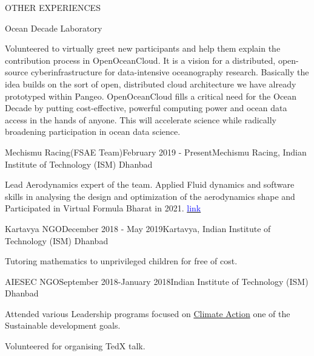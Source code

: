 \documentclass{resume} %
\begin{document}
\begin{rSection}{OTHER EXPERIENCES}
\begin{rSubsection}{Ocean Decade Laboratory}{}{}
\item Volunteered to virtually greet new participants and help them explain the contribution process in OpenOceanCloud. It is a vision for a distributed, open-source cyberinfrastructure for data-intensive oceanography research. Basically the idea builds on the sort of open, distributed cloud architecture we have already prototyped within Pangeo. OpenOceanCloud fills a critical need for the Ocean Decade by putting cost-effective, powerful computing power and ocean data access in the hands of anyone. This will accelerate science while radically broadening participation in ocean data science. 
\end{rSubsection}

\begin{rSubsection}{Mechismu Racing(FSAE Team)}{February 2019 - Present}{Mechismu Racing, Indian Institute of Technology (ISM) Dhanbad}
\item Lead Aerodynamics expert of the team. Applied Fluid dynamics and software skills in analysing the design and optimization of the aerodynamics shape and Participated in Virtual Formula Bharat in 2021. 
\href{https://drive.google.com/file/d/1gxg4ES_sFsu9u8YnKFnXOZkrpout1oJu/view?usp=sharing}{\textcolor{blue}{link}}

\end{rSubsection}

\begin{rSubsection}{Kartavya NGO}{December 2018 - May 2019}{Kartavya, Indian Institute of Technology (ISM) Dhanbad}
\item Tutoring mathematics to unprivileged children for free of cost. 
\end{rSubsection}

\begin{rSubsection}{AIESEC NGO}{September 2018-January 2018}{Indian Institute of Technology (ISM) Dhanbad}
\item Attended various Leadership programs focused on \underline{Climate Action} one of the Sustainable development goals.
\item Volunteered for organising TedX talk. 
\end{rSubsection}

\end{rSection}
\end{document}
